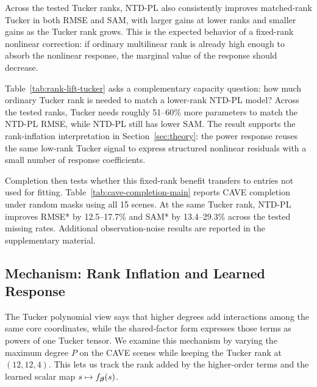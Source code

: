 Across the tested Tucker ranks, NTD-PL also consistently improves matched-rank
Tucker in both RMSE and SAM, with larger gains at lower ranks and smaller gains
as the Tucker rank grows. This is the expected behavior of a fixed-rank
nonlinear correction: if ordinary multilinear rank is already high enough to
absorb the nonlinear response, the marginal value of the response should
decrease.

\begin{table}[!t]
  \centering
  \caption{Tucker rank needed to match NTD-PL RMSE on CAVE reconstruction.
  NTD-PL uses \(P=6\). The parameter column shows NTD-PL \(\to\) Tucker;
  SAM is reported as NTD-PL/Tucker.}
  \label{tab:rank-lift-tucker}
  \scriptsize
  
\end{table}

Table~\ref{tab:rank-lift-tucker} asks a complementary capacity question: how
much ordinary Tucker rank is needed to match a lower-rank NTD-PL model? Across
the tested ranks, Tucker needs roughly 51--60\% more parameters to match the
NTD-PL RMSE, while NTD-PL still has lower SAM. The result supports the
rank-inflation interpretation in Section~\ref{sec:theory}: the power response
reuses the same low-rank Tucker signal to express structured nonlinear
residuals with a small number of response coefficients.

Completion then tests whether this fixed-rank benefit transfers to entries not
used for fitting. Table~\ref{tab:cave-completion-main} reports CAVE
completion under random masks using all 15 scenes. At the same Tucker rank,
NTD-PL improves RMSE* by
12.5--17.7\% and SAM* by 13.4--29.3\% across the tested missing
rates. Additional observation-noise results are reported in
the supplementary material.

\begin{table}[!t]
  \centering
  \caption{CAVE completion under random masks at Tucker rank \((33,33,4)\)
  and \(P=4\). RMSE* and SAM* are averaged over the entries hidden during fitting.}
  \label{tab:cave-completion-main}
  \scriptsize
  
\end{table}

\subsection{Mechanism: Rank Inflation and Learned Response}
\label{sec:exp-mechanism}

The Tucker polynomial view says that higher degrees add interactions among the
same core coordinates, while the shared-factor form expresses those terms as
powers of one Tucker tensor. We examine this mechanism by varying the maximum
degree \(P\) on the CAVE scenes while keeping the Tucker rank at
\((12,12,4)\). This lets us track the rank added by the higher-order terms and
the learned scalar map \(s\mapsto f_{\boldsymbol{\beta}}(s)\).

